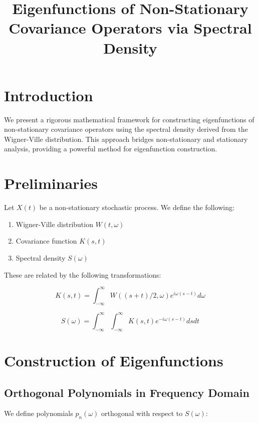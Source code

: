 \documentclass{article}
\title{Eigenfunctions of Non-Stationary Covariance Operators via Spectral Density}
\author{}
\date{}
\begin{document}
\maketitle

\section{Introduction}

We present a rigorous mathematical framework for constructing eigenfunctions of non-stationary covariance operators using the spectral density derived from the Wigner-Ville distribution. This approach bridges non-stationary and stationary analysis, providing a powerful method for eigenfunction construction.

\section{Preliminaries}

Let $X(t)$ be a non-stationary stochastic process. We define the following:

\begin{enumerate}
    \item Wigner-Ville distribution $W(t,\omega)$
    \item Covariance function $K(s,t)$
    \item Spectral density $S(\omega)$
\end{enumerate}

These are related by the following transformations:

\begin{equation}
K(s,t) = \int_{-\infty}^{\infty} W((s+t)/2, \omega) e^{i\omega(s-t)} d\omega
\end{equation}

\begin{equation}
S(\omega) = \int_{-\infty}^{\infty}\int_{-\infty}^{\infty} K(s,t) e^{-i\omega(s-t)} ds dt
\end{equation}

\section{Construction of Eigenfunctions}

\subsection{Orthogonal Polynomials in Frequency Domain}

We define polynomials $p_n(\omega)$ orthogonal with respect to $S(\omega)$:
\end{document}

